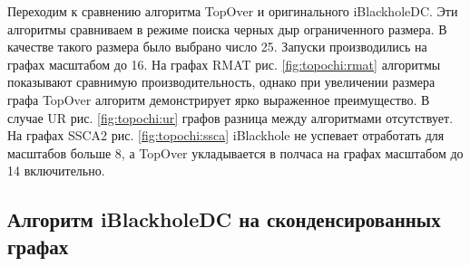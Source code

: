 \documentclass[12pt,a4paper,oneside,openany]{article}
\theoremstyle{definition}
\theoremstyle{lemma}
\theoremstyle{remark}
\begin{document}
Переходим к сравнению алгоритма TopOver и оригинального iBlackholeDC.
Эти алгоритмы сравниваем в режиме поиска черных дыр ограниченного размера.
В качестве такого размера было выбрано число 25.
Запуски производились на графах масштабом до 16.
На графах RMAT рис. \ref{fig:topochi:rmat} алгоритмы показывают сравнимую производительность,
однако при увеличении размера графа TopOver алгоритм демонстрирует ярко выраженное преимущество.
В случае UR рис. \ref{fig:topochi:ur} графов разница между алгоритмами отсутствует.
На графах SSCA2 рис. \ref{fig:topochi:ssca} iBlackhole не успевает отработать для масштабов больше 8, а TopOver укладывается
в полчаса на графах масштабом до 14 включительно.

\subsection{Алгоритм iBlackholeDC на сконденсированных графах}\label{subsec:chineseasync}
\end{document}

